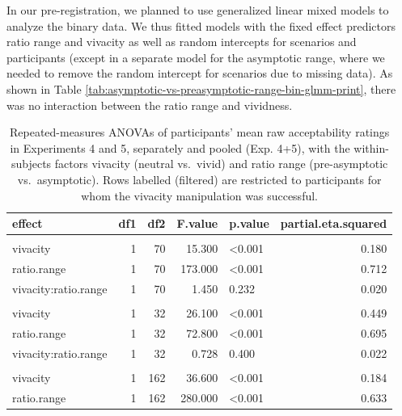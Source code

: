 \documentclass[
]{article}
\begin{document}
In our pre-registration, we planned to use generalized linear mixed models to analyze the binary data. We thus fitted models with the fixed effect predictors ratio range and vivacity as well as random intercepts for scenarios and participants (except in a separate model for the asymptotic range, where we needed to remove the random intercept for scenarios due to missing data). As shown in Table \ref{tab:asymptotic-vs-preasymptotic-range-bin-glmm-print}, there was no interaction between the ratio range and vividness.

\begin{table}
\centering
\caption{\label{tab:exp8-10-asymptotic-vs-preasymptotic-range-anova}Repeated-measures ANOVAs of participants' mean raw acceptability ratings in Experiments 4 and 5, separately and pooled (Exp. 4+5), with the within-subjects factors vivacity (neutral vs.\ vivid) and ratio range (pre-asymptotic vs.\ asymptotic). Rows labelled (filtered) are restricted to participants for whom the vivacity manipulation was successful.}
\centering
\begin{tabular}[t]{lrrrlr}
\toprule
effect & df1 & df2 & F.value & p.value & partial.eta.squared\\
\midrule
\addlinespace[0.3em]
\multicolumn{6}{l}{\textbf{Exp. 5}}\\
\hspace{1em}vivacity & 1 & 70 & 15.300 & <0.001 & 0.180\\
\hspace{1em}ratio.range & 1 & 70 & 173.000 & <0.001 & 0.712\\
\hspace{1em}vivacity:ratio.range & 1 & 70 & 1.450 & 0.232 & 0.020\\
\addlinespace[0.3em]
\multicolumn{6}{l}{\textbf{Exp. 5 (filtered)}}\\
\hspace{1em}vivacity & 1 & 32 & 26.100 & <0.001 & 0.449\\
\hspace{1em}ratio.range & 1 & 32 & 72.800 & <0.001 & 0.695\\
\hspace{1em}vivacity:ratio.range & 1 & 32 & 0.728 & 0.400 & 0.022\\
\addlinespace[0.3em]
\multicolumn{6}{l}{\textbf{Exp. 4+5}}\\
\hspace{1em}vivacity & 1 & 162 & 36.600 & <0.001 & 0.184\\
\hspace{1em}ratio.range & 1 & 162 & 280.000 & <0.001 & 0.633\\

\end{tabular}
\end{table}
\end{document}
